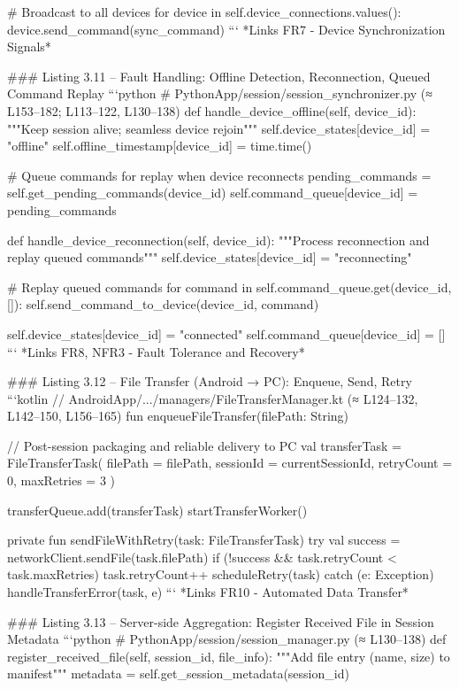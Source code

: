 \documentclass[12pt,a4paper]{article}
\begin{document}
{    # Broadcast to all devices
    for device in self.device_connections.values():
        device.send_command(sync_command)
```
*Links FR7 - Device Synchronization Signals*

### Listing 3.11 – Fault Handling: Offline Detection, Reconnection, Queued Command Replay
```python
# PythonApp/session/session_synchronizer.py (≈ L153–182; L113–122, L130–138)
def handle_device_offline(self, device_id):
    """Keep session alive; seamless device rejoin"""
    self.device_states[device_id] = "offline"
    self.offline_timestamp[device_id] = time.time()
    
    # Queue commands for replay when device reconnects
    pending_commands = self.get_pending_commands(device_id)
    self.command_queue[device_id] = pending_commands
    
def handle_device_reconnection(self, device_id):
    """Process reconnection and replay queued commands"""
    self.device_states[device_id] = "reconnecting"
    
    # Replay queued commands
    for command in self.command_queue.get(device_id, []):
        self.send_command_to_device(device_id, command)
    
    self.device_states[device_id] = "connected"
    self.command_queue[device_id] = []
```
*Links FR8, NFR3 - Fault Tolerance and Recovery*

### Listing 3.12 – File Transfer (Android → PC): Enqueue, Send, Retry
```kotlin
// AndroidApp/.../managers/FileTransferManager.kt (≈ L124–132, L142–150, L156–165)
fun enqueueFileTransfer(filePath: String) {
    // Post-session packaging and reliable delivery to PC
    val transferTask = FileTransferTask(
        filePath = filePath,
        sessionId = currentSessionId,
        retryCount = 0,
        maxRetries = 3
    )
    
    transferQueue.add(transferTask)
    startTransferWorker()
}

private fun sendFileWithRetry(task: FileTransferTask) {
    try {
        val success = networkClient.sendFile(task.filePath)
        if (!success && task.retryCount < task.maxRetries) {
            task.retryCount++
            scheduleRetry(task)
        }
    } catch (e: Exception) {
        handleTransferError(task, e)
    }
}
```
*Links FR10 - Automated Data Transfer*

### Listing 3.13 – Server-side Aggregation: Register Received File in Session Metadata
```python
# PythonApp/session/session_manager.py (≈ L130–138)
def register_received_file(self, session_id, file_info):
    """Add file entry (name, size) to manifest"""
    metadata = self.get_session_metadata(session_id)
    
}
\end{document}
